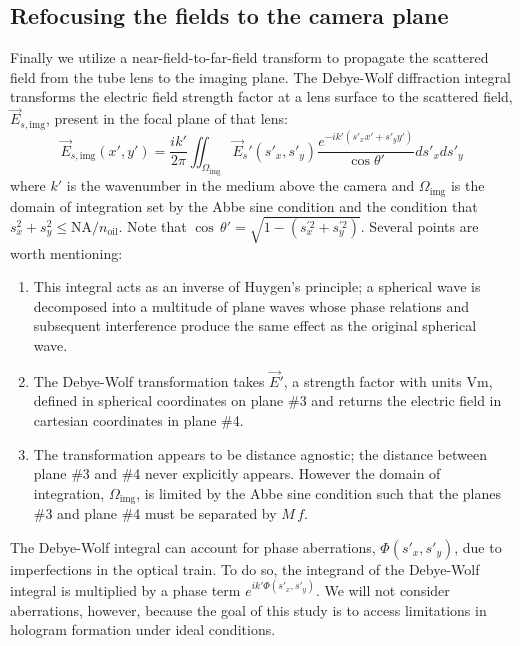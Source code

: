 \subsection{Refocusing the fields to the camera plane}
Finally we utilize a near-field-to-far-field transform to propagate the scattered
field from the tube lens to the imaging plane.
The Debye-Wolf diffraction integral transforms the electric field strength factor at a lens
surface to the scattered field, $\vec{E}_{s,\text{img}}$, present in the focal plane of that
lens:
\begin{equation}
  \vec{E}_{s,\text{img}}(x', y') = \frac{i k'}{2 \pi} \iint_{\Omega_{\text{img}}} \vec{E}_s'(s'_x, s'_y) \frac{e^{-ik'(s'_xx'+s'_yy')}}{\cos{\theta'}}ds'_xds'_y 
  \label{eq:debyewolf}
\end{equation}
where $k'$ is the wavenumber in the medium above the camera and $\Omega_{\text{img}}$
is the domain of integration set by the Abbe sine condition and the condition
that $s_x^2+s_y^2 \le \text{NA}/n_{\text{oil}}$. Note that $\cos \, \theta' = \sqrt{ 1 - (s_x^{\prime 2} + s_y^{\prime 2} )}$. Several points are worth mentioning:
\begin{enumerate}
\item This integral acts as an inverse of Huygen's principle; a spherical wave is
  decomposed into a multitude of plane waves whose phase relations and subsequent
  interference produce the same effect as the original spherical wave.
\item The Debye-Wolf transformation takes $\vec{E}'$, a strength factor with units
  $\si{\volt\meter}$, defined in spherical coordinates on plane \#\num{3} and
  returns the electric field  in cartesian coordinates in plane \#\num{4}.
\item The transformation appears to be distance agnostic; the distance
  between plane \#\num{3} and \#\num{4} never explicitly appears. However the domain
  of integration, $\Omega_{\text{img}}$, is limited by the Abbe sine condition
  such that the planes \#\num{3} and plane \#\num{4} must be separated by $M \, f$.
\end{enumerate}

The Debye-Wolf integral can account for phase aberrations, $\Phi(s'_x,s'_y)$,
due to imperfections in the optical train.
To do so, the integrand of the Debye-Wolf integral is multiplied by a phase term
$e^{ik'\Phi(s'_x,s'_y)}$. We will not consider aberrations, however, because
the goal of this study is to access limitations in hologram formation
under ideal conditions.

